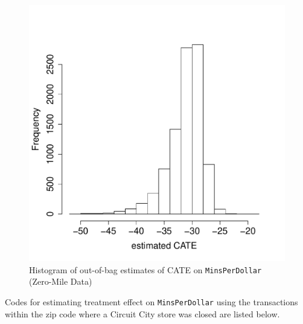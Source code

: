 \documentclass{article}
\begin{document}
\begin{figure}[h]
	\centering
	\includegraphics[width=0.5\linewidth]{pic/tauhat5_ama_hist.pdf}\caption{Histogram of out-of-bag estimates of CATE  on \texttt{MinsPerDollar} (Zero-Mile Data)}\label{fig:tauhat5_ama_hist}
\end{figure}

Codes for estimating treatment effect on \texttt{MinsPerDollar} using the transactions within the zip code where a Circuit City store was closed are listed below.


\pagebreak


% 
\end{document}
